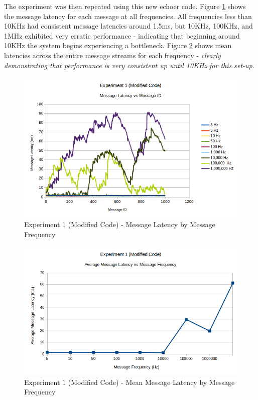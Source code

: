 \documentclass[../dissertation.tex]{subfiles}
\begin{document}
The experiment was then repeated using this new echoer code\cite{Experiment1NoEchoDelayCode}. Figure \ref{exp1-modified-all-freqs} shows the message latency for each message at all frequencies. All frequencies less than 10KHz had consistent message latencies around 1.5ms, but 10KHz, 100KHz, and 1MHz exhibited very erratic performance - indicating that beginning around 10KHz the system begins experiencing a bottleneck. Figure \ref{exp1-modified-mean-latency-all-freqs} shows mean latencies across the entire message streams for each frequency - \textit{clearly demonstrating that performance is very consistent up until 10KHz for this set-up}.

\begin{figure}[H]
\centering
\includegraphics[width=\textwidth]{images/experiment1/modified_msgid_msglatency_all_freqs.png}
\caption{Experiment 1 (Modified Code) - Message Latency by Message Frequency}
\label{exp1-modified-all-freqs}
\end{figure}

\begin{figure}[H]
\centering
\includegraphics[width=\textwidth]{images/experiment1/modified_average_msglatency_all_freqs.png}
\caption{Experiment 1 (Modified Code) - Mean Message Latency by Message Frequency}
\label{exp1-modified-mean-latency-all-freqs}
\end{figure}
\end{document}
